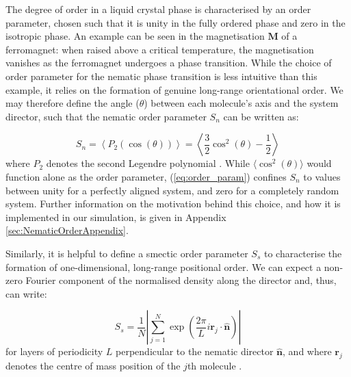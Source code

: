 \documentclass[11pt, a4paper]{article} %
\begin{document}
The degree of order in a liquid crystal phase is characterised by an order parameter, chosen such that it is unity in the fully ordered phase and zero in the isotropic phase. An example can be seen in the magnetisation $\textbf{M}$ of a ferromagnet: when raised above a critical temperature, the magnetisation vanishes as the ferromagnet undergoes a phase transition. While the choice of order parameter for the nematic phase transition is less intuitive than this example, it relies on the formation of genuine long-range orientational order. We may therefore define the angle ($\theta$) between each molecule's axis and the system director, such that the nematic order parameter $S_{n}$ can be written as:

\begin{equation} \label{eq:order_param}
S_{n} = \left\langle P_{2}(\cos(\theta)) \right\rangle = \left\langle \frac{3}{2}\cos^{2}(\theta) - \frac{1}{2} \right\rangle 
\end{equation} where $P_{2}$ denotes the second Legendre polynomial \cite{DeGennes1993}. While $\langle \cos^{2}(\theta) \rangle$ would function alone as the order parameter, (\ref{eq:order_param}) confines $S_{n}$ to values between unity for a perfectly aligned system, and zero for a completely random system. Further information on the motivation behind this choice, and how it is implemented in our simulation, is given in Appendix \ref{sec:NematicOrderAppendix}.

Similarly, it is helpful to define a smectic order parameter $S_{s}$ to characterise the formation of one-dimensional, long-range positional order. We can expect a non-zero Fourier component of the normalised density along the director \cite{Polson1997} and, thus, can write:

\begin{equation}
S_{s} = \frac{1}{N} \left\lvert \sum_{j=1}^{N} \exp \left( {\frac{2\pi}{L}i\textbf{r}_{j} \cdot \boldsymbol{\hat{n}}} \right) \right\rvert
\end{equation} for layers of periodicity $L$ perpendicular to the nematic director $\boldsymbol{\hat{n}}$, and where $\textbf{r}_{j}$ denotes the centre of mass position of the $j$th molecule \cite{Dussi2018}.
\end{document}
